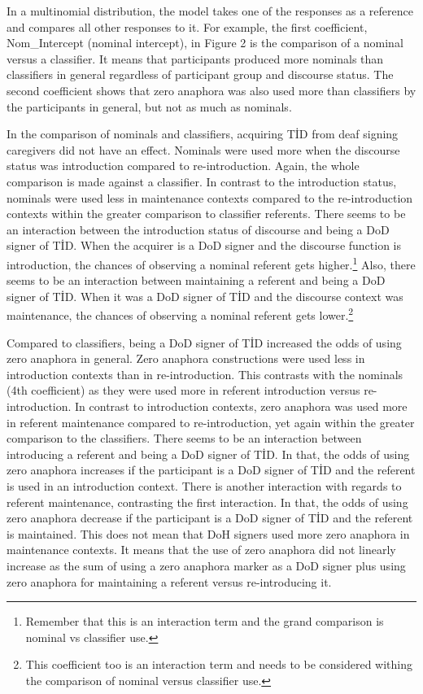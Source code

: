 \documentclass[]{elsarticle} %
\begin{document}
In a multinomial distribution, the model takes one of the responses as a
reference and compares all other responses to it. For example, the first
coefficient, Nom\_Intercept (nominal intercept), in Figure 2 is the
comparison of a nominal versus a classifier. It means that participants
produced more nominals than classifiers in general regardless of
participant group and discourse status. The second coefficient shows
that zero anaphora was also used more than classifiers by the
participants in general, but not as much as nominals.

In the comparison of nominals and classifiers, acquiring TİD from deaf
signing caregivers did not have an effect. Nominals were used more when
the discourse status was introduction compared to re-introduction.
Again, the whole comparison is made against a classifier. In contrast to
the introduction status, nominals were used less in maintenance contexts
compared to the re-introduction contexts within the greater comparison
to classifier referents. There seems to be an interaction between the
introduction status of discourse and being a DoD signer of TİD. When the
acquirer is a DoD signer and the discourse function is introduction, the
chances of observing a nominal referent gets
higher.\footnote{Remember that this is an interaction term and the grand comparison is nominal vs classifier use.}
Also, there seems to be an interaction between maintaining a referent
and being a DoD signer of TİD. When it was a DoD signer of TİD and the
discourse context was maintenance, the chances of observing a nominal
referent gets
lower.\footnote{This coefficient too is an interaction term and needs to be considered withing the comparison of nominal versus classifier use.}

Compared to classifiers, being a DoD signer of TİD increased the odds of
using zero anaphora in general. Zero anaphora constructions were used
less in introduction contexts than in re-introduction. This contrasts
with the nominals (4th coefficient) as they were used more in referent
introduction versus re-introduction. In contrast to introduction
contexts, zero anaphora was used more in referent maintenance compared
to re-introduction, yet again within the greater comparison to the
classifiers. There seems to be an interaction between introducing a
referent and being a DoD signer of TİD. In that, the odds of using zero
anaphora increases if the participant is a DoD signer of TİD and the
referent is used in an introduction context. There is another
interaction with regards to referent maintenance, contrasting the first
interaction. In that, the odds of using zero anaphora decrease if the
participant is a DoD signer of TİD and the referent is maintained. This
does not mean that DoH signers used more zero anaphora in maintenance
contexts. It means that the use of zero anaphora did not linearly
increase as the sum of using a zero anaphora marker as a DoD signer plus
using zero anaphora for maintaining a referent versus re-introducing it.
\end{document}

